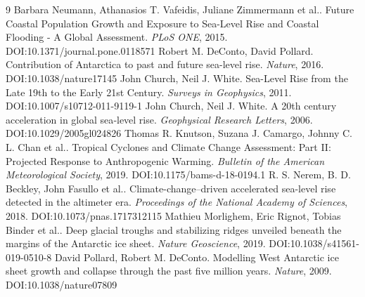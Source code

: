 \documentclass[11pt]{article}
\begin{document}
\begin{thebibliography}{9}
 Barbara Neumann, Athanasios T. Vafeidis, Juliane Zimmermann et al.. Future Coastal Population Growth and Exposure to Sea-Level Rise and Coastal Flooding - A Global Assessment. \emph{PLoS ONE}, 2015. DOI:10.1371/journal.pone.0118571
 Robert M. DeConto, David Pollard. Contribution of Antarctica to past and future sea-level rise. \emph{Nature}, 2016. DOI:10.1038/nature17145
 John Church, Neil J. White. Sea-Level Rise from the Late 19th to the Early 21st Century. \emph{Surveys in Geophysics}, 2011. DOI:10.1007/s10712-011-9119-1
 John Church, Neil J. White. A 20th century acceleration in global sea‐level rise. \emph{Geophysical Research Letters}, 2006. DOI:10.1029/2005gl024826
 Thomas R. Knutson, Suzana J. Camargo, Johnny C. L. Chan et al.. Tropical Cyclones and Climate Change Assessment: Part II: Projected Response to Anthropogenic Warming. \emph{Bulletin of the American Meteorological Society}, 2019. DOI:10.1175/bams-d-18-0194.1
 R. S. Nerem, B. D. Beckley, John Fasullo et al.. Climate-change–driven accelerated sea-level rise detected in the altimeter era. \emph{Proceedings of the National Academy of Sciences}, 2018. DOI:10.1073/pnas.1717312115
 Mathieu Morlighem, Eric Rignot, Tobias Binder et al.. Deep glacial troughs and stabilizing ridges unveiled beneath the margins of the Antarctic ice sheet. \emph{Nature Geoscience}, 2019. DOI:10.1038/s41561-019-0510-8
 David Pollard, Robert M. DeConto. Modelling West Antarctic ice sheet growth and collapse through the past five million years. \emph{Nature}, 2009. DOI:10.1038/nature07809
\end{thebibliography}
\end{document}
